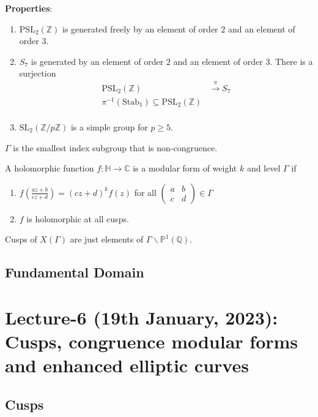 \documentclass[oneside, 12pt]{scrbook}
\newcommand{\CC}{\mathbb C}
\newcommand{\QQ}{\mathbb Q}
\newcommand{\ZZ}{\mathbb Z}
\newcommand{\PP}{\mathbb{P}}
\newcommand{\SL}{\mathrm{SL}}
\theoremstyle{theorem}
\begin{document}
\textbf{Properties}:
\begin{enumerate}
\item $\mathrm{PSL}_{2}(\ZZ)$ is generated freely by an element of order $2$ and an element of order $3$.
\item $S_{7}$ is generated by an element of order $2$ and an element of order $3$. There is a surjection 
\begin{align*}
\mathrm{PSL}_{2}(\ZZ) &\xrightarrow{\pi} S_{7} \\
\pi^{-1}(\mathrm{Stab}_{1}) \subseteq \mathrm{PSL}_{2}(\ZZ) \\
\end{align*}
\item $\SL_{2}(\ZZ/p\ZZ)$ is a simple group for $p \geq 5$.
\end{enumerate}

\begin{remark}
$\Gamma$ is the smallest index subgroup that is non-congruence.
\end{remark}

\begin{definition}
A holomorphic function $f: \mathbb{H} \rightarrow \CC$ is a modular form of weight $k$ and level $\Gamma$ if 
\begin{enumerate}
\item $f\left(\frac{az+b}{cz+d}\right) = (cz+d)^k f(z)$ for all $\begin{pmatrix}
a & b \\ c & d
\end{pmatrix} \in \Gamma$
\item $f$ is holomorphic at all cusps.
\end{enumerate}
Cusps of $X(\Gamma)$ are just elements of $\Gamma \backslash \PP^1 (\QQ)$.
\end{definition}

\section{Fundamental Domain}


\chapter{Lecture-6 (19th January, 2023): Cusps, congruence modular forms and enhanced elliptic curves}

\section{Cusps}
\end{document}
